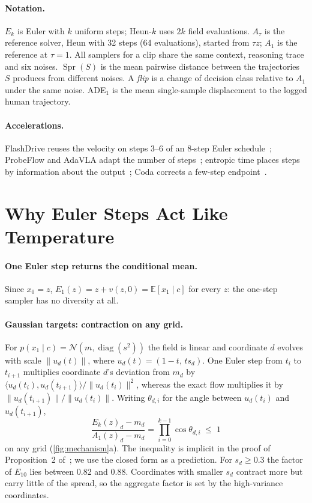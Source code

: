 \documentclass{article}
\theoremstyle{plain}
\theoremstyle{definition}
\theoremstyle{remark}
\newcommand{\Aref}{A_{1}}
\newcommand{\Atau}{A_{\tau}}
\newcommand{\Spr}{\operatorname{Spr}}
\newcommand{\E}{\mathbb{E}}
\begin{document}
\paragraph{Notation.} $E_k$ is Euler with $k$ uniform steps; Heun-$k$ uses $2k$ field evaluations. $\Atau$ is the reference solver, Heun with 32 steps (64 evaluations), started from $\tau z$; $\Aref$ is the reference at $\tau=1$. All samplers for a clip share the same context, reasoning trace and six noises. $\Spr(S)$ is the mean pairwise distance between the trajectories $S$ produces from different noises. A \emph{flip} is a change of decision class relative to $\Aref$ under the same noise. ADE$_1$ is the mean single-sample displacement to the logged human trajectory.

\paragraph{Accelerations.} FlashDrive reuses the velocity on steps 3--6 of an 8-step Euler schedule~\citep{flashdrive2026}; ProbeFlow and AdaVLA adapt the number of steps~\citep{probeflow2026,adavla2026}; entropic time places steps by information about the output~\citep{stancevic2025entropic}; Coda corrects a few-step endpoint~\citep{coda2026}.

\section{Why Euler Steps Act Like Temperature}
\label{sec:theory}

\paragraph{One Euler step returns the conditional mean.} Since $x_0=z$, $E_1(z)=z+v(z,0)=\E[x_1\mid c]$ for every $z$: the one-step sampler has no diversity at all.

\paragraph{Gaussian targets: contraction on any grid.} For $p(x_1\mid c)=\mathcal{N}(m,\operatorname{diag}(s^2))$ the field is linear and coordinate $d$ evolves with scale $\|u_d(t)\|$, where $u_d(t)=(1-t,\,ts_d)$. One Euler step from $t_i$ to $t_{i+1}$ multiplies coordinate $d$'s deviation from $m_d$ by $\langle u_d(t_i),u_d(t_{i+1})\rangle/\|u_d(t_i)\|^2$, whereas the exact flow multiplies it by $\|u_d(t_{i+1})\|/\|u_d(t_i)\|$. Writing $\theta_{d,i}$ for the angle between $u_d(t_i)$ and $u_d(t_{i+1})$,
\begin{equation}
  \frac{E_k(z)_d-m_d}{\Aref(z)_d-m_d}=\prod_{i=0}^{k-1}\cos\theta_{d,i}\;\le\;1
  \label{eq:contraction}
\end{equation}
on any grid (\cref{fig:mechanism}a). The inequality is implicit in the proof of Proposition~2 of~\citet{claustre2026gaussian}; we use the closed form as a prediction. For $s_d\ge0.3$ the factor of $E_{10}$ lies between 0.82 and 0.88. Coordinates with smaller $s_d$ contract more but carry little of the spread, so the aggregate factor is set by the high-variance coordinates.
\end{document}
